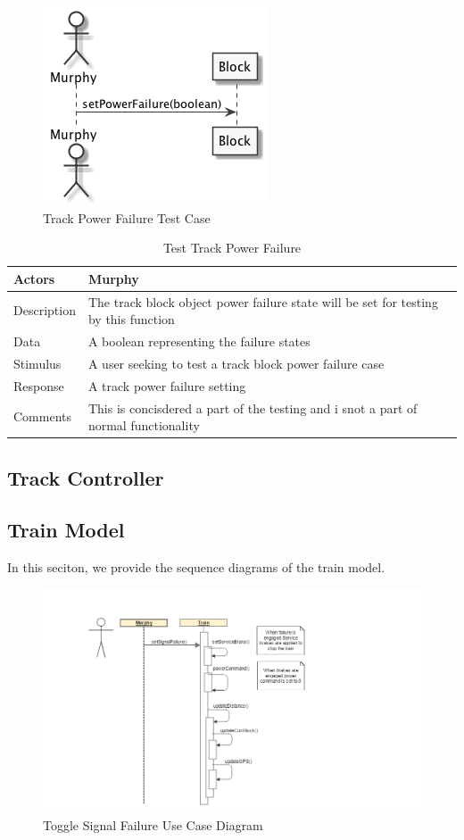 \documentclass[]{article}
\begin{document}
\begin{figure}[H]
	\centering
	\includegraphics[scale=.5]{setPowerFailure.png}
	\caption{Track Power Failure Test Case}
\end{figure}
\begin{table}[H]
	\centering
	\caption{Test Track Power Failure}
	\begin{tabular}{|l|l|}
		\hline
		Actors & \parbox[t]{10cm}{Murphy} \\ \hline
		Description & \parbox[t]{10cm}{The track block object power failure state will be set for testing by this function} \\ \hline
		Data &  \parbox[t]{10cm}{A boolean representing the failure states} \\ \hline
		Stimulus &  \parbox[t]{10cm}{A user seeking to test a track block power failure case} \\ \hline
		Response & \parbox[t]{10cm}{A track power failure setting}\\ \hline
		Comments & \parbox[t]{10cm}{This is concisdered a part of the testing and i snot a part of normal functionality}  \\ \hline
	\end{tabular}
\end{table}
\subsection{Track Controller}

\subsection{Train Model}
In this seciton, we provide the sequence diagrams of the train model.
\begin{figure}[H]
	\centering
	\includegraphics[scale=.5]{train_model_sqd_toggle_signal_failure.png}
	\caption{Toggle Signal Failure Use Case Diagram}
\end{figure}
\end{document}
